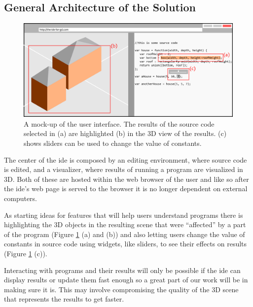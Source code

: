 \documentclass{./llncs2e/llncs}
\begin{document}

\subsection{General Architecture of the Solution}
	
	\begin{figure}
		\centering
		\includegraphics[width=1.0\textwidth]{img/ui_mock}
		\caption{A mock-up of the user interface. The results of the source code selected in (a) are highlighted (b) in the 3D view of the results. (c) shows sliders can be used to change the value of constants.}
		\label{fig:ui:mock}
	\end{figure}
	
	The center of the \ac{ide} is composed by an editing environment, where source code is edited, and a visualizer, where results of running a program are visualized in 3D.
	Both of these are hosted within the web browser of the user and like so after the \ac{ide}'s web page is served to the browser it is no longer dependent on external computers.
	
	As starting ideas for features that will help users understand programs there is highlighting the 3D objects in the resulting scene that were ``affected'' by a part of the program (Figure \ref{fig:ui:mock} (a) and (b)) and also letting users change the value of constants in source code using widgets, like sliders, to see their effects on results (Figure \ref{fig:ui:mock} (c)).
	
	Interacting with programs and their results will only be possible if the \ac{ide} can display results or update them fast enough so a great part of our work will be in making sure it is.
	This may involve compromising the quality of the 3D scene that represents the results to get faster.
	
\end{document}
